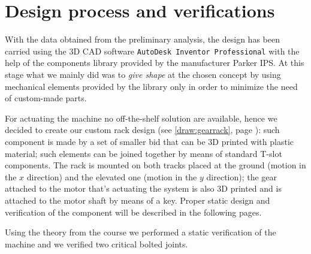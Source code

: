 \section{Design process and verifications}
	With the data obtained from the preliminary analysis, the design has been carried using the 3D CAD software \texttt{AutoDesk Inventor Professional} with the help of the components library provided by the manufacturer Parker IPS. At this stage what we mainly did was to \textit{give shape} at the chosen concept by using mechanical elements provided by the library only in order to minimize the need of custom-made parts.
	
	For actuating the machine no off-the-shelf solution are available, hence we decided to create our custom rack design (see \ref{draw:gearrack}, page \pageref{draw:gearrack}): such component is made by a set of smaller bid that can be 3D printed with plastic material; such elements can be joined together by means of standard T-slot components. The rack is mounted on both tracks placed at the ground (motion in the $x$ direction) and the elevated one (motion in the $y$ direction); the gear attached to the motor that's actuating the system is also 3D printed and is attached to the motor  shaft by means of a key. Proper static design and verification of the component will be described in the following pages.
	
	Using the theory from the course we performed a static verification of the machine and we verified two critical bolted joints.
	
	
	
	
	
